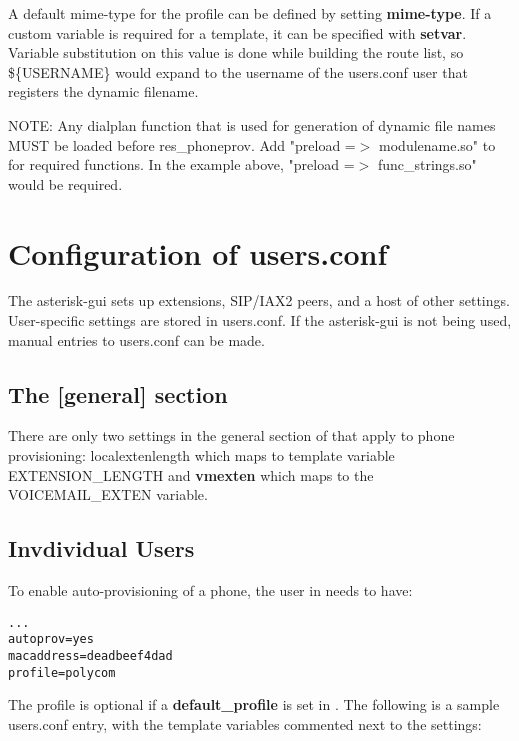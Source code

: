 A default mime-type for the profile can be defined by setting \textbf{mime-type}.  If a 
custom variable is required for a template, it can be specified with \textbf{setvar}. 
Variable substitution on this value is done while building the route list, so 
\$\{USERNAME\} would expand to the username of the users.conf user that registers the 
dynamic filename.

NOTE: Any dialplan function that is used for generation of dynamic file names MUST be 
loaded before res\_phoneprov. Add "preload =$>$ modulename.so" to 
 for required functions. In the example above, "preload =$>$
func\_strings.so" would be required.

\section{Configuration of users.conf}

The asterisk-gui sets up extensions, SIP/IAX2 peers, and a host of other settings. 
User-specific settings are stored in users.conf. If the asterisk-gui is not being used, 
manual entries to users.conf can be made.

\subsection{The [general] section}

There are only two settings in the general section of  that apply to 
phone provisioning: localextenlength which maps to template variable EXTENSION\_LENGTH 
and \textbf{vmexten} which maps to the VOICEMAIL\_EXTEN variable.

\subsection{Invdividual Users}

To enable auto-provisioning of a phone, the user in  needs to have:

\begin{astlisting}
\begin{verbatim}
...
autoprov=yes
macaddress=deadbeef4dad
profile=polycom
\end{verbatim}
\end{astlisting}

The profile is optional if a \textbf{default\_profile} is set in . 
The following is a sample users.conf entry, with the template variables commented next to 
the settings:

